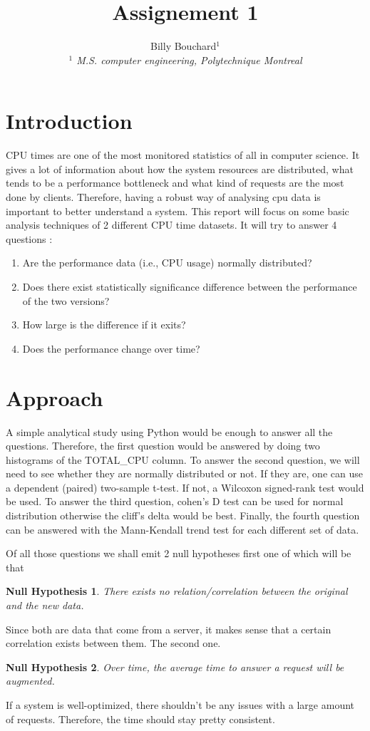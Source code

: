 \documentclass[10pt, conference]{IEEEtran}
\title{Assignement 1}
\author{Billy Bouchard$^{1}$
    \\
    \emph{$^{1}$  M.S. computer engineering, Polytechnique Montreal}}
\newtheorem{nullhypothesis}{Null Hypothesis}
\begin{document}
\maketitle


\section{Introduction}
\label{sec:introduction}

CPU times are one of the most monitored statistics of all in computer science.
It gives a lot of information about how the system resources are distributed, what tends to be a performance bottleneck and what kind of requests are the most done by clients. 
Therefore, having a robust way of analysing cpu data is important to better understand a system.
This report will focus on some basic analysis techniques of 2 different CPU time datasets.
It will try to answer 4 questions : 
\begin{enumerate}
    \item Are the performance data (i.e., CPU usage) normally distributed?
    \item Does there exist statistically significance difference between the performance of the two versions?
    \item How large is the difference if it exits?
    \item Does the performance change over time?
\end{enumerate}

\section{Approach}
\label{sec:approach}

A simple analytical study using Python would be enough to answer all the questions.
Therefore, the first question would be answered by doing two histograms of the TOTAL\_CPU column.
To answer the second question, we will need to see whether they are normally distributed or not. 
If they are, one can use a dependent (paired) two-sample t-test.
If not, a Wilcoxon signed-rank test would be used.
To answer the third question, cohen's D test can be used for normal distribution otherwise the cliff's delta would be best.
Finally, the fourth question can be answered with the Mann-Kendall trend test for each different set of data.

Of all those questions we shall emit 2 null hypotheses first one of which will be that 
\begin{nullhypothesis}
    There exists no relation/correlation between the original and the new data.
\end{nullhypothesis} 
Since both are data that come from a server, it makes sense that a certain correlation exists between them.
The second one. 
\begin{nullhypothesis}
    Over time, the average time to answer a request will be augmented.
\end{nullhypothesis} 
 If a system is well-optimized, there shouldn't be any issues with a large amount of requests. Therefore, the time should stay pretty consistent.
\end{document}
